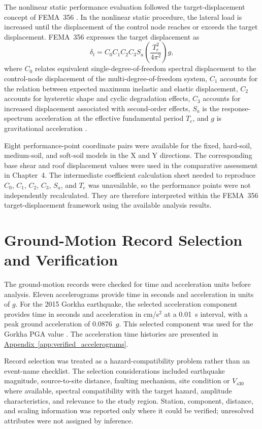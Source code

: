 The nonlinear static performance evaluation followed the target-displacement concept of FEMA~356 \cite{fema356}. In the nonlinear static procedure, the lateral load is increased until the displacement of the control node reaches or exceeds the target displacement. FEMA~356 expresses the target displacement as
\begin{equation}
\delta_t=C_0 C_1 C_2 C_3 S_a\left(\frac{T_e^2}{4\pi^2}\right)g,
\label{eq:fema356_target_displacement}
\end{equation}
where $C_0$ relates equivalent single-degree-of-freedom spectral displacement to the control-node displacement of the multi-degree-of-freedom system, $C_1$ accounts for the relation between expected maximum inelastic and elastic displacement, $C_2$ accounts for hysteretic shape and cyclic degradation effects, $C_3$ accounts for increased displacement associated with second-order effects, $S_a$ is the response-spectrum acceleration at the effective fundamental period $T_e$, and $g$ is gravitational acceleration \cite{fema356}.

Eight performance-point coordinate pairs were available for the fixed, hard-soil, medium-soil, and soft-soil models in the X and Y directions. The corresponding base shear and roof displacement values were used in the comparative assessment in Chapter~4. The intermediate coefficient calculation sheet needed to reproduce $C_0$, $C_1$, $C_2$, $C_3$, $S_a$, and $T_e$ was unavailable, so the performance points were not independently recalculated. They are therefore interpreted within the FEMA~356 target-displacement framework using the available analysis results.

\section{Ground-Motion Record Selection and Verification}
The ground-motion records were checked for time and acceleration units before analysis. Eleven accelerograms provide time in seconds and acceleration in units of $g$. For the 2015 Gorkha earthquake, the selected acceleration component provides time in seconds and acceleration in cm/s$^2$ at a 0.01~s interval, with a peak ground acceleration of 0.0876~$g$. This selected component was used for the Gorkha PGA value \cite{takai2016gorkha,shigefuji2022gorkha}. The acceleration time histories are presented in \hyperref[app:verified_accelerograms]{Appendix~\ref*{app:verified_accelerograms}}.

Record selection was treated as a hazard-compatibility problem rather than an event-name checklist. The selection considerations included earthquake magnitude, source-to-site distance, faulting mechanism, site condition or $V_{s30}$ where available, spectral compatibility with the target hazard, amplitude characteristics, and relevance to the study region. Station, component, distance, and scaling information was reported only where it could be verified; unresolved attributes were not assigned by inference.

